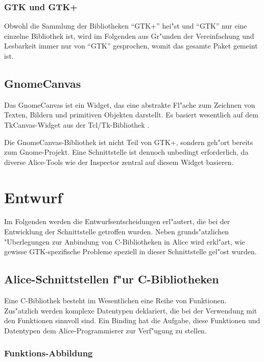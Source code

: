 \documentclass[a4paper,titlepage]{article}
\begin{document}
\subsubsection*{GTK und GTK+}

Obwohl die Sammlung der Bibliotheken ``GTK+'' hei"st und ``GTK'' nur eine
einzelne Bibliothek ist, wird im Folgenden aus Gr"unden der Vereinfachung
und Lesbarkeit immer nur von ``GTK'' gesprochen, womit das gesamte
Paket gemeint ist.

\subsection{GnomeCanvas}

Das GnomeCanvas ist ein Widget, das eine abstrakte
Fl"ache zum Zeichnen von Texten, Bildern und primitiven
Objekten darstellt. Es basiert wesentlich auf dem TkCanvas-Widget aus
der Tcl/Tk-Bibliothek \cite{tcltk}.

Die GnomeCanvas-Bibliothek ist nicht Teil
von GTK+, sondern geh"ort bereits zum Gnome-Projekt. Eine Schnittstelle ist 
dennoch unbedingt erforderlich, da diverse Alice-Tools
wie der Inspector zentral auf diesem Widget basieren.


\section{Entwurf}

Im Folgenden werden die Entwurfsentscheidungen erl"autert, 
die bei der Entwicklung der Schnittstelle getroffen wurden.
Neben grunds"atzlichen "Uberlegungen zur Anbindung von C-Bibliotheken in Alice
wird erkl"art, wie gewisse GTK-spezifische Probleme speziell in 
dieser Schnittstelle gel"ost wurden.

\subsection{Alice-Schnittstellen f"ur C-Bibliotheken}

Eine C-Bibliothek besteht im Wesentlichen eine Reihe von Funktionen.
Zus"atzlich werden komplexe Datentypen deklariert, die bei der Verwendung
mit den Funktionen sinnvoll sind. Ein Binding hat die Aufgabe, diese
Funktionen und Datentypen dem Alice-Programmierer zur Verf"ugung zu stellen.

\subsubsection*{Funktions-Abbildung}
\end{document}
